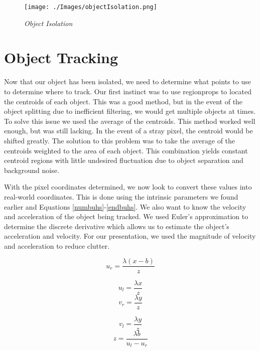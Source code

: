 \documentclass{IEEEtran}
\begin{document}
 \begin{figure*}[httb]
  \centering
  \texttt{[image: ./Images/objectIsolation.png]}
  \caption{\emph{Object Isolation}}
  \label{objectIsolation}
\end{figure*}


\section{Object Tracking}
Now that our object has been isolated, we need to determine what points to use to determine where to track. Our first instinct was to use regionprops to located the centroids of each object. This was a good method, but in the event of the object splitting due to inefficient filtering, we would get multiple objects at times. To solve this issue we used the average of the centroids. This method worked well enough, but was still lacking. In the event of a stray pixel, the centroid would be shifted greatly. The solution to this problem was to take the average of the centroids weighted to the area of each object. This combination yields constant centroid regions with little undesired fluctuation due to object separation and background noise.

With the pixel coordinates determined, we now look to convert these values into real-world coordinates. This is done using the intrinsic parameters we found earlier and Equations \ref{numbuhs}-\ref{endbuhs}. We also want to know the velocity and acceleration of the object being tracked. We used Euler’s approximation to determine the discrete derivative which allows us to estimate the object’s acceleration and velocity. For our presentation, we used the magnitude of velocity and acceleration to reduce clutter.

\begin{equation}
\label{numbuhs}
u_r = \frac{\lambda (x-b)}{z}
\end{equation}


\begin{equation}
u_l=\frac{\lambda x}{z}
\end{equation}
\begin{equation}
v_r=\frac{\lambda y}{z}
\end{equation}

\begin{equation}
v_l=\frac{\lambda y}{z}
\end{equation}
\begin{equation}
\label{endbuhs}
z=\frac{\lambda b}{u_l - u_r}
\end{equation}
\end{document}
